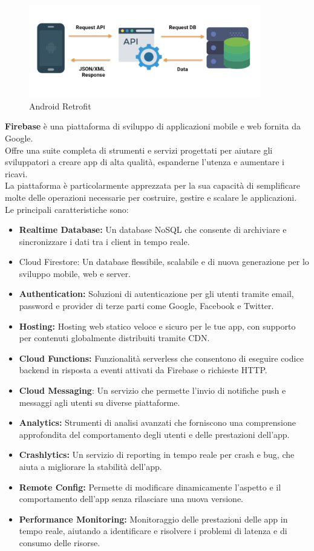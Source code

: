 \documentclass{article}
\begin{document}
		\begin{figure}[H]
			\centering
			\includegraphics[width=0.9\textwidth]{Immagini/retrofit}
			\caption{Android Retrofit}
		\end{figure}
		\textbf{Firebase} è una piattaforma di sviluppo di applicazioni mobile e web fornita da Google.\\
		Offre una suite completa di strumenti e servizi progettati per aiutare gli sviluppatori a creare app di alta qualità, espanderne l'utenza e aumentare i ricavi.\\
		La piattaforma è particolarmente apprezzata per la sua capacità di semplificare molte delle operazioni necessarie per costruire, gestire e scalare le applicazioni.\\
		Le principali caratteristiche sono:
		\begin{itemize}
			\item \textbf{Realtime Database:} Un database NoSQL che consente di archiviare e sincronizzare i dati tra i client in tempo reale.
			\item Cloud Firestore: Un database flessibile, scalabile e di nuova generazione per lo sviluppo mobile, web e server.
			\item \textbf{Authentication:} Soluzioni di autenticazione per gli utenti tramite email, password e provider di terze parti come Google, Facebook e Twitter.
			\item \textbf{Hosting:} Hosting web statico veloce e sicuro per le tue app, con supporto per contenuti globalmente distribuiti tramite CDN.
			\item \textbf{Cloud Functions:} Funzionalità serverless che consentono di eseguire codice backend in risposta a eventi attivati da Firebase o richieste HTTP.
			\item \textbf{Cloud Messaging}: Un servizio che permette l'invio di notifiche push e messaggi agli utenti su diverse piattaforme.
			\item \textbf{Analytics:} Strumenti di analisi avanzati che forniscono una comprensione approfondita del comportamento degli utenti e delle prestazioni dell'app.
			\item \textbf{Crashlytics:} Un servizio di reporting in tempo reale per crash e bug, che aiuta a migliorare la stabilità dell'app.
			\item \textbf{Remote Config:} Permette di modificare dinamicamente l'aspetto e il comportamento dell'app senza rilasciare una nuova versione.
			\item \textbf{Performance Monitoring:} Monitoraggio delle prestazioni delle app in tempo reale, aiutando a identificare e risolvere i problemi di latenza e di consumo delle risorse.
		\end{itemize}
\end{document}
